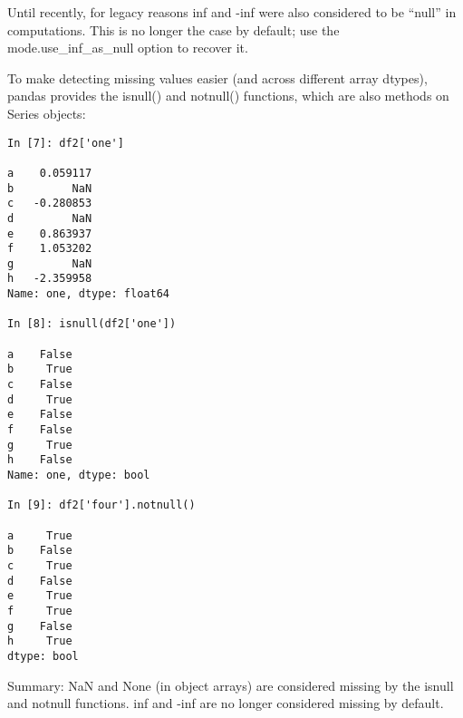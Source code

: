 \documentclass[11pt]{article} %
\begin{document}
Until recently, for legacy reasons inf and -inf were also considered to be “null” in computations. This is no longer the case by default; use the mode.use_inf_as_null option to recover it.

To make detecting missing values easier (and across different array dtypes), pandas provides the isnull() and notnull() functions, which are also methods on Series objects:

\begin{verbatim}
In [7]: df2['one']

a    0.059117
b         NaN
c   -0.280853
d         NaN
e    0.863937
f    1.053202
g         NaN
h   -2.359958
Name: one, dtype: float64

In [8]: isnull(df2['one'])

a    False
b     True
c    False
d     True
e    False
f    False
g     True
h    False
Name: one, dtype: bool

In [9]: df2['four'].notnull()

a     True
b    False
c     True
d    False
e     True
f     True
g    False
h     True
dtype: bool
\end{verbatim}
Summary: NaN and None (in object arrays) are considered missing by the isnull and notnull functions. inf and -inf are no longer considered missing by default.
\end{document}
